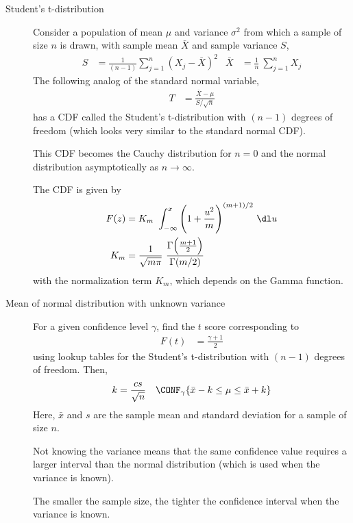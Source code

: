 \begin{description}
    \item[Student's t-distribution] Consider a population of mean $ \mu $ and variance
          $ \sigma^2 $ from which a sample of size $ n $ is drawn, with sample mean
          $ \bar{X} $ and sample variance $ S $,
          \begin{align}
              S       & = \frac{1}{(n-1)} \sum_{j=1}^{n} (X_j - \bar{X})^2 &
              \bar{X} & = \frac{1}{n}\ \sum_{j=1}^{n} X_j
          \end{align}
          The following analog of the standard normal variable,
          \begin{align}
              T & = \frac{\bar{X} - \mu}{S/\sqrt{n}}
          \end{align}
          has a CDF called the Student's t-distribution with $ (n-1) $ degrees of freedom
          (which looks very similar to the standard normal CDF). \par
          This CDF becomes the Cauchy distribution for $ n=0 $ and the normal
          distribution asymptotically as $ n \to \infty $. \par
          The CDF is given by
          \begin{align}
              F(z) & = K_m\ \int_{-\infty}^{x} \Bigg( 1 + \frac{u^2}{m}
              \Bigg)^{(m+1)/2}
              \ \dl u                                                                \\
              K_m  & = \frac{1}{\sqrt{m\pi}}\ \frac{\Gamma\Big( \frac{m+1}{2} \Big)}
              {\Gamma(m/2)}
          \end{align}
          with the normalization term $ K_m $, which depends on the Gamma function.

    \item[Mean of normal distribution with unknown variance] For a given confidence
          level $ \gamma $, find the $ t $ score corresponding to
          \begin{align}
              F(t) & = \frac{\gamma + 1}{2}
          \end{align}
          using lookup tables for the Student's t-distribution with $ (n-1) $ degrees of
          freedom. Then,
          \begin{align}
              k & = \frac{cs}{\sqrt{n}} &
              \CONF_\gamma\{\bar{x} - k \leq \mu \leq \bar{x} + k\}
          \end{align}
          Here, $ \bar{x} $ and $ s $ are the sample mean and standard deviation for a
          sample of size $ n $. \par
          Not knowing the variance means that the same confidence value requires a
          larger interval than the normal distribution (which is used when the variance
          is known). \par
          The smaller the sample size, the tighter the confidence interval when
          the variance is known.


\end{description}
